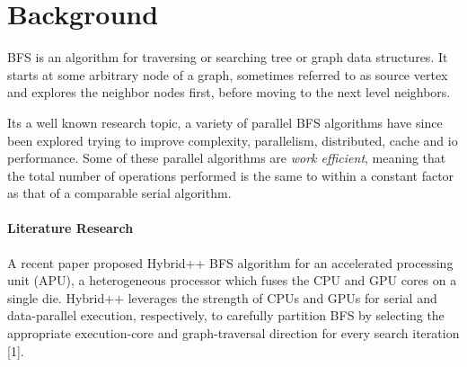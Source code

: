\section{Background}
\label{bg}

%
%
%
%
%
%
%

BFS is an algorithm for traversing or searching tree or graph data structures.
It starts at some arbitrary node of a graph, sometimes referred to as source
vertex and explores the neighbor nodes first, before moving to the next level
neighbors.

Its a well known research topic, a variety of parallel BFS algorithms have
since been explored trying to improve complexity, parallelism, distributed,
cache and io performance. Some of these parallel algorithms are \emph{work
efficient}, meaning that the total number of operations performed is the same
to within a constant factor as that of a comparable serial algorithm.

\paragraph{Literature Research}
A recent paper proposed Hybrid++ BFS algorithm for an accelerated processing
unit (APU), a heterogeneous processor which fuses the CPU and GPU cores on a
single die. Hybrid++ leverages the strength of CPUs and GPUs for serial and
data-parallel execution, respectively, to carefully partition BFS by selecting
the appropriate execution-core and graph-traversal direction for every search
iteration [1].

